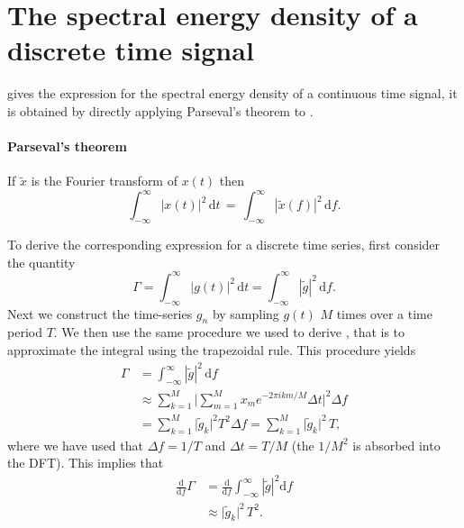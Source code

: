 \section{The spectral energy density of a discrete time signal}
 gives the expression for the spectral energy density of a continuous time signal,
it is obtained by directly applying Parseval's theorem to .
\begin{mdframed}[nobreak=true]
\paragraph{Parseval's theorem}
If $\widetilde{x}$ is the Fourier transform of $x(t)$ then
\begin{equation}
\int_{-\infty}^{\infty} |x(t)|^2 \, \mathrm{d} t \, = \, \int_{-\infty}^{\infty} |\widetilde{x}(f)|^2 \, \mathrm{d} f. 
\end{equation}  
\end{mdframed}
To derive the corresponding expression for a discrete time series, first consider the quantity
\begin{equation}
\Gamma = \int_{-\infty}^{\infty} |g(t)|^2 \, \mathrm{d} t = \int_{-\infty}^{\infty} |\widetilde{g}|^2 \, \mathrm{d} f.  
\end{equation}
Next we construct the time-series $g_n$ by sampling $g(t)$ $M$ times over a time period $T$.
We then use the same procedure we used to derive , that is
to approximate the integral using the trapezoidal rule. This procedure yields
\begin{align} 
\Gamma &= \int_{-\infty}^{\infty} |\widetilde{g}|^2 \, \mathrm{d} f \nonumber \\ 
& \approx \sum_{k=1}^{M} \Big| \sum_{m=1}^{M} x_m e^{-2 \pi i k m/M} \Delta t \Big|^2 \Delta f \nonumber \\
& = \sum_{k=1}^{M} \big|\widetilde{g}_k \big|^2 T^2 \Delta f =  \sum_{k=1}^{M} \big|\widetilde{g}_k \big|^2 \, T,
\end{align}
where we have used that $\Delta f = 1/T$ and $\Delta t = T/M$ 
(the $1/M^2$ is absorbed into the DFT). 
This implies that 
\begin{align}
\frac{\mathrm{d}}{\mathrm{d} f} \Gamma &= \frac{\mathrm{d}}{\mathrm{d} f} \int_{-\infty}^{\infty} |\widetilde{g}|^2 \mathrm{d} f \nonumber \\
&\approx \big|\widetilde{g}_k \big|^2 \, T^2.
\end{align}
